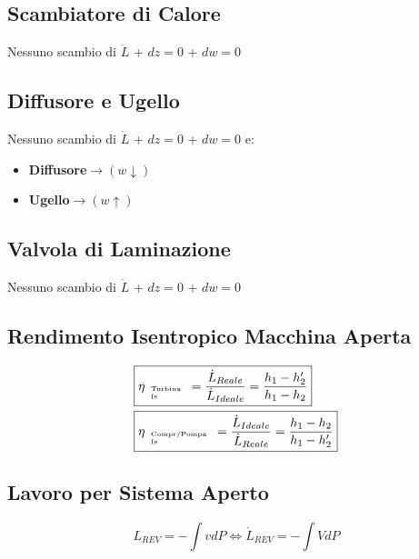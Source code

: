 \documentclass[a4paper]{report}
\begin{document}
\subsection*{Scambiatore di Calore}
Nessuno scambio di $\dot{L}$ + $dz=0$ + $dw=0$


\subsection*{Diffusore e Ugello}
Nessuno scambio di $\dot{L}$ + $dz=0$ + $dw=0$ e:
\begin{itemize}
    \item \textbf{Diffusore}$\longrightarrow (w\downarrow)$
    \item  \textbf{Ugello}$\longrightarrow (w\uparrow)$
\end{itemize}


\subsection*{Valvola di Laminazione}
Nessuno scambio di $\dot{L}$ + $dz=0$ + $dw=0$


\subsection*{Rendimento Isentropico Macchina Aperta}
\begin{align*}
    &\boxed{\eta_{\begin{tiny}\begin{array}{l}
        \text{Turbina}\\
        \text{Is}
    \end{array}\end{tiny}} = \frac{\dot{L}_{Reale}}{\dot{L}_{Ideale}} = \frac{h_1-h_2'}{h_1-h_2} }\\
    &\boxed{\eta_{\begin{tiny}\begin{array}{l}
        \text{Compr/Pompa}\\
        \text{Is}
    \end{array}\end{tiny}} = \frac{\dot{L}_{Ideale}}{\dot{L}_{Reale}} = \frac{h_1-h_2}{h_1-h_2'} }
\end{align*}


\subsection*{Lavoro per Sistema Aperto}
\[
    \boxed{L_{REV} = -\int v dP} \iff \boxed{\dot{L}_{REV} = -\int V dP}
\]
\end{document}
